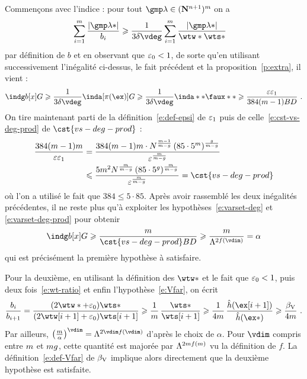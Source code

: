 Commençons avec l'indice : pour tout \( \imp \in (\N^{\dimp+1})^\puiss \) on a
\begin{align}
  \sum\fctrange \frac{ \lgr{\imp*} }{ b_\fct }
  & \ge
  \frac1{ 3 \delta \vdeg }
  \sum\fctrange
  \frac{ \lgr{\imp*} }{ \wtw* \wts* }
\end{align}
par définition de \( b \) et en observant que \( \varepsilon\sb0 < 1 \), de sorte qu'en
utilisant successivement l'inégalité ci-dessus, le fait précédent et la
proposition~\vref{p:extra}, il vient :
\begin{equation}
  \indg b[x] G
  \ge
  \frac1{ 3 \delta \vdeg } \inda[\pi(\ex)] G
  \ge
  \frac1{ 3 \delta \vdeg } \inda** \faux**
  \ge
  \frac{ \expapx \epsi }{ 384 (\puiss-1) B D }
  \pmm.
\end{equation}
On tire maintenant parti de la définition~\eqref{e:def-epsi} de \( \varepsilon\sb1
\) puis de celle~\eqref{e:cst-vs-deg-prod} de \( \cst{vs-deg-prod} \) :
\begin{align}
  \frac{ 384 (\puiss-1) \puiss }{ \expapx \epsi }
  & =
  \frac{
    384 (\puiss-1) \puiss
    \cdot N^{ \frac{\puiss-1}{\puiss-\genre} }
    \, (85 \cdot 5^\puiss)^{ \frac{\genre}{\puiss-\genre} }
  }{
    \expapx^{ \frac{\puiss}{\puiss-\genre} }
  }
  \\ & \le
  \frac{
    5 \puiss^2
    N^{ \frac{\puiss}{\puiss-\genre} }
    \, (85 \cdot 5^\genre)^{ \frac{\puiss}{\puiss-\genre} }
  }{
    \expapx^{ \frac{\puiss}{\puiss-\genre} }
  }
  =
  \cst{vs-deg-prod}
  \label{e:ct-cst-vs-deg}
\end{align}
où l'on a utilisé le fait que \( 384 \le 5 \cdot 85 \).
Après avoir rassemblé les deux inégalités précédentes, il ne reste plus qu'à
exploiter les hypothèses~\eqref{e:varset-deg} et \eqref{e:varset-deg-prod}
pour obtenir
\begin{equation} \label{e:tp-ind}
  \indg b[x] G
  \ge
  \frac{ \puiss }{ \cst{vs-deg-prod} B D }
  \ge
  \frac{ \puiss }{ \Lambda^{2f(\vdim)} }
  =
  \alpha
\end{equation}
qui est précisément la première hypothèse à satisfaire.

Pour la deuxième, en utilisant la définition des \( \wtw* \) et le fait que \(
  \varepsilon\sb0 < 1 \), puis deux fois~\eqref{e:wt-ratio} et enfin
l'hypothèse~\eqref{e:Vfar}, on écrit
\begin{equation} \label{e:ct-Vfar}
  \frac{ b_\fct }{ b_{\fct+1} }
  =
  \frac{
    (2\wtw* + \epsz) \wts*
  }{
    (2\wtw[\fct+1] + \epsz) \wts[\fct+1]
  }
  \ge
  \frac1\puiss \,
  \frac{ \wts* }{ \wts[\fct+1] }
  \ge
  \frac1{4\puiss} \,
  \frac{ \hautn{ \ex[\fct+1] } }{ \hautn{ \ex* } }
  \ge
  \frac{ \Vfar }{ 4\puiss }
  \pmm.
\end{equation}
Par ailleurs, \( \bigl( \frac\puiss\alpha \bigr)^\vdim = \Lambda^{2\vdim
    f(\vdim)} \) d'après le choix de \( \alpha \). Pour \( \vdim \) compris
entre \( m \) et \( mg \), cette quantité est majorée par \(
  \Lambda^{2m f(m)} \) vu la définition de \( f \). La
définition~\eqref{e:def-Vfar} de \( \beta \sb{\mathrm{V}} \) implique alors directement que la
deuxième hypothèse est satisfaite.

